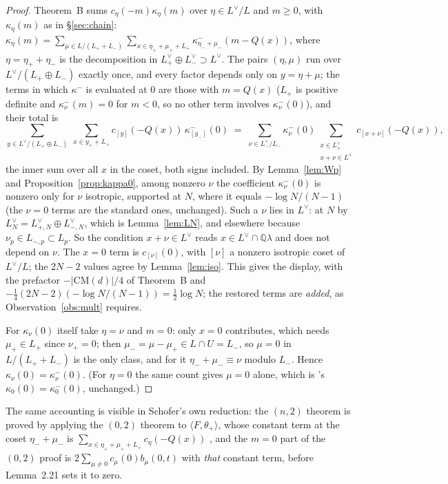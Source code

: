 \documentclass[11pt,reqno]{amsart}
\theoremstyle{plain}
\theoremstyle{definition}
\newcommand{\Q}{\mathbb{Q}}
\newcommand{\Ldual}{L^{\vee}}
\newcommand{\Lm}{L_{-}}
\newcommand{\Lp}{L_{+}}
\begin{document}
\begin{proof}
Theorem~B sums $c_\eta(-m)\kappa_\eta(m)$ over $\eta\in\Ldual/L$ and $m\ge0$, with $\kappa_\eta(m)$
as in \S\ref{sec:chain}: $\kappa_\eta(m)=\sum_{\mu\in L/(\Lp+\Lm)}\sum_{x\in\eta_++\mu_++\Lp}
\kappa^-_{\eta_-+\mu_-}(m-Q(x))$, where $\eta=\eta_++\eta_-$ is the decomposition in
$\Lp^\vee\oplus\Lm^\vee\supset\Ldual$. The pairs $(\eta,\mu)$ run over $\Ldual/(\Lp\oplus\Lm)$
exactly once, and every factor depends only on $y=\eta+\mu$; the terms in which $\kappa^-$ is
evaluated at $0$ are those with $m=Q(x)$ ($\Lp$ is positive definite and $\kappa^-_\nu(m)=0$ for
$m<0$, so no other term involves $\kappa^-_\nu(0)$), and their total is
\[
  \sum_{y\in\Ldual/(\Lp\oplus\Lm)}\ \sum_{x\in y_++\Lp}c_{[y]}(-Q(x))\,\kappa^-_{[y_-]}(0)
  \;=\;\sum_{\nu\in\Lm^\vee/\Lm}\kappa^-_\nu(0)\sum_{\substack{x\in\Lp^\vee\\ x+\nu\in\Ldual}}
      c_{[x+\nu]}(-Q(x)),
\]
the inner sum over all $x$ in the coset, both signs included. By Lemma~\ref{lem:Wp} and
Proposition~\ref{prop:kappa0}, among nonzero $\nu$ the coefficient $\kappa^-_\nu(0)$ is nonzero
only for $\nu$ isotropic, supported at $N$, where it equals $-\log N/(N-1)$ (the $\nu=0$ terms are
the standard ones, unchanged). Such a $\nu$ lies in $\Ldual$: at $N$ by $L_N^\vee=L_{+,N}^\vee
\oplus L_{-,N}^\vee$, which is Lemma~\ref{lem:LN}, and elsewhere because $\nu_p\in L_{-,p}\subset
L_p$. So the condition $x+\nu\in\Ldual$ reads $x\in\Ldual\cap\Q\lambda$ and does not depend on
$\nu$. The $x=0$ term is $c_{[\nu]}(0)$, with $[\nu]$ a nonzero isotropic coset of $\Ldual/L$; the
$2N-2$ values agree by Lemma~\ref{lem:iso}. This gives the display, with the prefactor
$-\lvert\mathrm{CM}(d)\rvert/4$ of Theorem~B and $-\tfrac14(2N-2)(-\log N/(N-1))=\tfrac12\log N$;
the restored terms are \emph{added}, as Observation~\ref{obs:mult} requires.

For $\kappa_\nu(0)$ itself take $\eta=\nu$ and $m=0$: only $x=0$ contributes, which needs
$\mu_+\in\Lp$ since $\nu_+=0$; then $\mu_-=\mu-\mu_+\in L\cap U=\Lm$, so $\mu=0$ in $L/(\Lp+\Lm)$
is the only class, and for it $\eta_-+\mu_-\equiv\nu$ modulo $\Lm$. Hence $\kappa_\nu(0)=
\kappa^-_\nu(0)$. (For $\eta=0$ the same count gives $\mu=0$ alone, which is \cite[Lemma~20]{Yang}'s
$\kappa_0(0)=\kappa^-_0(0)$, unchanged.)
\end{proof}

The same accounting is visible in Schofer's own reduction: the $(n,2)$ theorem is proved by
applying the $(0,2)$ theorem to $\langle F,\theta_+\rangle$, whose constant term at the coset
$\eta_-+\mu_-$ is $\sum_{x\in\eta_++\mu_++\Lp}c_\eta(-Q(x))$ \cite[Cor.~3.2]{Schofer}, and the
$m=0$ part of the $(0,2)$ proof is $2\sum_{\mu\neq0}c_\mu(0)b_\mu(0,t)$ with \emph{that}
constant term, before Lemma~2.21 sets it to zero.
\end{document}
